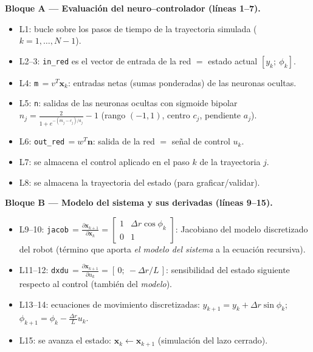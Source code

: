 \documentclass[11pt,a4paper]{article}
\newcommand{\pd}[2]{\frac{\partial #1}{\partial #2}}
\begin{document}
\textbf{Bloque A — Evaluación del neuro--controlador (líneas 1--7).}
\begin{itemize}[itemsep=1pt]
\item L1: bucle sobre los pasos de tiempo de la trayectoria simulada ($k=1,\dots,N-1$).
\item L2--3: \texttt{in\_red} es el vector de entrada de la red $=$ estado actual $[y_k;\ \phi_k]$.
\item L4: \texttt{m}$\,=v^{T}\mathbf x_k$: entradas netas (sumas ponderadas) de las neuronas ocultas.
\item L5: \texttt{n}: salidas de las neuronas ocultas con sigmoide bipolar $n_j=\frac{2}{1+e^{-(m_j-c_j)/a_j}}-1$ (rango $(-1,1)$, centro $c_j$, pendiente $a_j$).
\item L6: \texttt{out\_red}$\,=w^{T}\mathbf n$: salida de la red $=$ señal de control $u_k$.
\item L7: se almacena el control aplicado en el paso $k$ de la trayectoria $j$.
\item L8: se almacena la trayectoria del estado (para graficar/validar).
\end{itemize}

\textbf{Bloque B — Modelo del sistema y sus derivadas (líneas 9--15).}
\begin{itemize}[itemsep=1pt]
\item L9--10: \texttt{jacob}$\,=\pd{\mathbf x_{k+1}}{\mathbf x_k}=\begin{bmatrix}1 & \Delta r\cos\phi_k\\ 0 & 1\end{bmatrix}$: Jacobiano del modelo discretizado del robot (término que aporta \emph{el modelo del sistema} a la ecuación recursiva).
\item L11--12: \texttt{dxdu}$\,=\pd{\mathbf x_{k+1}}{u_k}=[\,0;\ -\Delta r/L\,]$: sensibilidad del estado siguiente respecto al control (también del \emph{modelo}).
\item L13--14: ecuaciones de movimiento discretizadas: $y_{k+1}=y_k+\Delta r\sin\phi_k$;\quad $\phi_{k+1}=\phi_k-\frac{\Delta r}{L}u_k$.
\item L15: se avanza el estado: $\mathbf x_k\leftarrow\mathbf x_{k+1}$ (simulación del lazo cerrado).
\end{itemize}
\end{document}
